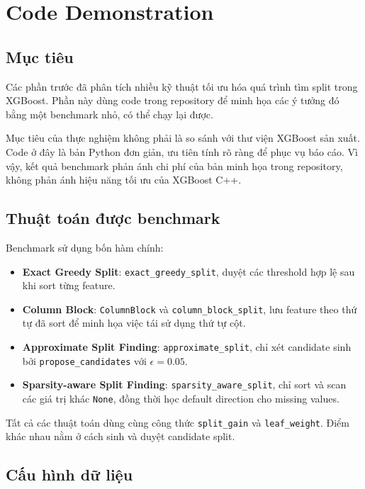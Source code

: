 \section{Code Demonstration}

\subsection{Mục tiêu}

Các phần trước đã phân tích nhiều kỹ thuật tối ưu hóa quá trình tìm split trong XGBoost. Phần này dùng code trong repository để minh họa các ý tưởng đó bằng một benchmark nhỏ, có thể chạy lại được.

Mục tiêu của thực nghiệm không phải là so sánh với thư viện XGBoost sản xuất. Code ở đây là bản Python đơn giản, ưu tiên tính rõ ràng để phục vụ báo cáo. Vì vậy, kết quả benchmark phản ánh chi phí của bản minh họa trong repository, không phản ánh hiệu năng tối ưu của XGBoost C++.

\subsection{Thuật toán được benchmark}

Benchmark sử dụng bốn hàm chính:

\begin{itemize}
    \item \textbf{Exact Greedy Split}: \texttt{exact\_greedy\_split}, duyệt các threshold hợp lệ sau khi sort từng feature.
    \item \textbf{Column Block}: \texttt{ColumnBlock} và \texttt{column\_block\_split}, lưu feature theo thứ tự đã sort để minh họa việc tái sử dụng thứ tự cột.
    \item \textbf{Approximate Split Finding}: \texttt{approximate\_split}, chỉ xét candidate sinh bởi \texttt{propose\_candidates} với $\epsilon = 0.05$.
    \item \textbf{Sparsity-aware Split Finding}: \texttt{sparsity\_aware\_split}, chỉ sort và scan các giá trị khác \texttt{None}, đồng thời học default direction cho missing values.
\end{itemize}

Tất cả các thuật toán dùng cùng công thức \texttt{split\_gain} và \texttt{leaf\_weight}. Điểm khác nhau nằm ở cách sinh và duyệt candidate split.

\subsection{Cấu hình dữ liệu}

